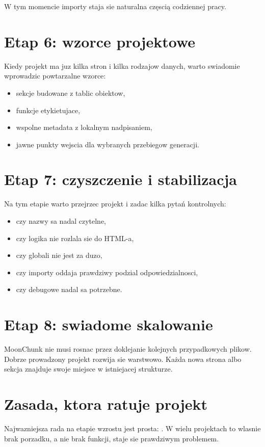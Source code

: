 W tym momencie importy staja sie naturalna częscią codziennej pracy.

\section{Etap 6: wzorce projektowe}
Kiedy projekt ma juz kilka stron i kilka rodzajow danych, warto swiadomie wprowadzic
powtarzalne wzorce:

\begin{itemize}
  \item sekcje budowane z tablic obiektow,
  \item funkcje etykietujace,
  \item wspolne metadata z lokalnym nadpisaniem,
  \item jawne punkty wejscia  dla wybranych przebiegow generacji.
\end{itemize}

\section{Etap 7: czyszczenie i stabilizacja}
Na tym etapie warto przejrzec projekt i zadac kilka pytań kontrolnych:

\begin{itemize}
  \item czy nazwy sa nadal czytelne,
  \item czy logika nie rozlala sie do HTML-a,
  \item czy globali nie jest za duzo,
  \item czy importy oddaja prawdziwy podzial odpowiedzialnosci,
  \item czy debugowe  nadal sa potrzebne.
\end{itemize}

\section{Etap 8: swiadome skalowanie}
MoonChunk nie musi rosnac przez doklejanie kolejnych przypadkowych plikow. Dobrze prowadzony
projekt rozwija sie warstwowo. Każda nowa strona albo sekcja znajduje swoje miejsce w
istniejacej strukturze.

\section{Zasada, ktora ratuje projekt}
Najwazniejsza rada na etapie wzrostu jest prosta: . W wielu projektach to wlasnie brak porzadku, a nie brak funkcji,
staje sie prawdziwym problemem.
